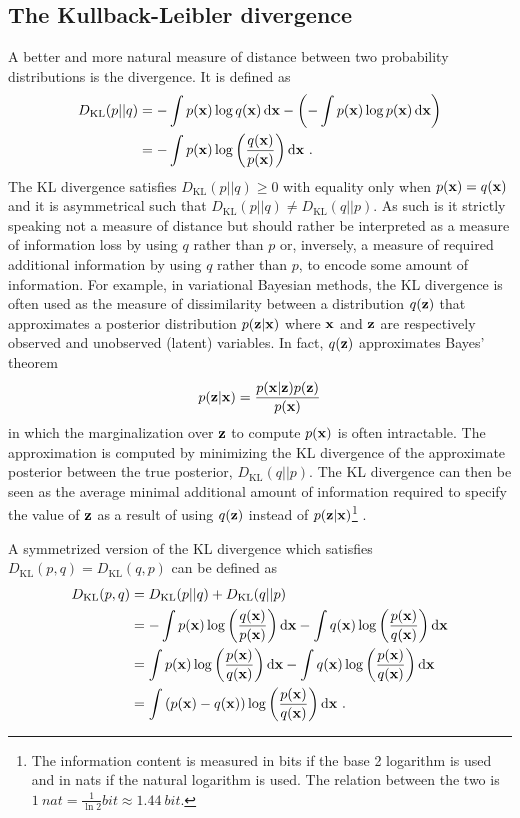 \subsection{The Kullback-Leibler divergence}\label{sec: Natural Gradient - KL divergence}
A better and more natural measure of distance between two probability distributions is the  divergence. It is defined as \cite{Bishop2006}
\begin{align}
    D_\text{KL}(p||q)
    &= -\int p(\x)\log q(\x)\,\text{d}\x - \pa{-\int p(\x)\log p(\x)\,\text{d}\x} \nonumber\\
    &= -\int p(\x)\log\pa{\frac{q(\x)}{p(\x)}}\,\text{d}\x \ .\label{eq: Theory: Definition of KL divergence}
\end{align}
The \gls{KL} divergence satisfies $D_\text{KL}(p||q)\geq0$ with equality only when $p({\mathbf{x}})=q({\mathbf{x}})$ and it is asymmetrical such that $D_\text{KL}(p||q)\ne D_\text{KL}(q||p)$. As such is it strictly speaking not a measure of distance but should rather be interpreted as a measure of information loss by using $q$ rather than $p$ or, inversely, a measure of required additional information by using $q$ rather than $p$, to encode some amount of information. For example, in variational Bayesian methods, the \gls{KL} divergence is often used as the measure of dissimilarity between a distribution $q({\mathbf{z}})$ that approximates a posterior distribution $p({\mathbf{z}}|{\mathbf{x}})$ where ${\mathbf{x}}$ and ${\mathbf{z}}$ are respectively observed and unobserved (latent) variables. In fact, $q({\mathbf{z}})$ approximates Bayes' theorem
\begin{equation}
    p({\mathbf{z}}|{\mathbf{x}}) = \frac{p({\mathbf{x}}|{\mathbf{z}})p({\mathbf{z}})}{p({\mathbf{x}})}
\end{equation}
in which the marginalization over ${\mathbf{z}}$ to compute $p({\mathbf{x}})$ is often intractable. The approximation is computed by minimizing the \gls{KL} divergence of the approximate posterior between the true posterior, $D_\text{KL}(q||p)$. The \gls{KL} divergence can then be seen as the average minimal additional amount of information required to specify the value of ${\mathbf{z}}$ as a result of using $q({\mathbf{z}})$ instead of $p({\mathbf{z}}|{\mathbf{x}})$\footnote{The information content is measured in bits if the base 2 logarithm is used and in nats if the natural logarithm is used. The relation between the two is $\SI{1}{nat}=\frac{1}{\ln 2}\si{bit} \approx \SI{1.44}{bit}$.} \cite{Bishop2006}.

A symmetrized version of the \gls{KL} divergence which satisfies $D_\text{KL}(p,q)=D_\text{KL}(q,p)$ can be defined as
\begin{align}
    D_\text{KL}(p,q)
    &= D_\text{KL}(p||q) + D_\text{KL}(q||p) \nonumber\\
    &= -\int p({\mathbf{x}})\log{\left(\frac{q({\mathbf{x}})}{p({\mathbf{x}})}\right)}\,\text{d}{\mathbf{x}} - \int q({\mathbf{x}})\log{\left(\frac{p({\mathbf{x}})}{q({\mathbf{x}})}\right)}\,\text{d}{\mathbf{x}} \nonumber\\
    &= \int p({\mathbf{x}})\log{\left(\frac{p({\mathbf{x}})}{q({\mathbf{x}})}\right)}\,\text{d}{\mathbf{x}} - \int q({\mathbf{x}})\log{\left(\frac{p({\mathbf{x}})}{q({\mathbf{x}})}\right)}\,\text{d}{\mathbf{x}} \nonumber\\
    &= \int {\left(p({\mathbf{x}})-q({\mathbf{x}})\right)}\log{\left(\frac{p({\mathbf{x}})}{q({\mathbf{x}})}\right)}\,\text{d}{\mathbf{x}} \ .\label{eq: Theory: Definition of symmetrized KL divergence}
\end{align}

